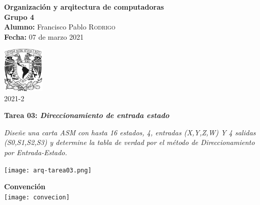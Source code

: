 \documentclass[12pt]{article}
\newcommand{\coverPage}{
  \begin{minipage}[t]{0.7\linewidth}
      \vspace{-1cm}
      \normalsize{\textbf{\materia}}\\
      \normalsize{\textbf{Grupo \grupo}}\\
      \normalsize{\textbf{Alumno:} \alumno} \\
      \textbf{Fecha:} \fechaEntrega%
  \end{minipage}\hfill
  \begin{minipage}[t]{0.2\linewidth}
      \vspace{-1.2cm}
      \begin{flushright}
          \includegraphics[width=2cm]{unam-negro}\\
          \semestre    
      \end{flushright}
  \end{minipage}
  \begin{center}
    \textbf{\actividad: \textit{\titulo}} \\ 
  \end{center}
}
\begin{document}

\graphicspath{ {latex/assets/} {arq-tarea03.assets/} }
\newcommand{\materia}{Organización y arqitectura de computadoras}
\newcommand{\clave}{1867}
\newcommand{\profesor}{M.I. Pedro Ignacio Rincón Gómez}
\newcommand{\grupo}{4}
\newcommand{\semestre}{2021-2}

\newcommand{\alumno}{Francisco Pablo \textsc{Rodrigo}}

\newcommand{\actividad}{Tarea 03}
\newcommand{\titulo}{Direccionamiento de entrada estado}

\newcommand{\fechaEntrega}{07 de marzo 2021}

\coverPage


\textit{Diseñe una carta ASM con hasta 16 estados, 4, entradas (X,Y,Z,W) Y
4 salidas (S0,S1,S2,S3) y determine la tabla de verdad por el método
de Direccionamiento por Entrada-Estado.}\\

\begin{center}
  \texttt{[image: arq-tarea03.png]}
\end{center}

\textbf{Convención}\\

\texttt{[image: convecion]}
\end{document}
